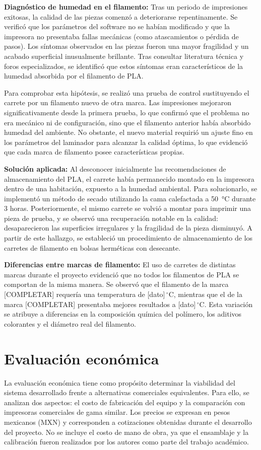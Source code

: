 \textbf{Diagnóstico de humedad en el filamento:} Tras un periodo de 
impresiones exitosas, la calidad de las piezas comenzó a deteriorarse 
repentinamente. Se verificó que los parámetros del software no se habían 
modificado y que la impresora no presentaba fallas mecánicas (como 
atascamientos o pérdida de pasos). Los síntomas observados en las piezas 
fueron una mayor fragilidad y un acabado superficial inusualmente brillante. 
Tras consultar literatura técnica y foros especializados, se identificó que 
estos síntomas eran característicos de la humedad absorbida por el filamento 
de PLA.

Para comprobar esta hipótesis, se realizó una prueba de control sustituyendo 
el carrete por un filamento nuevo de otra marca. Las impresiones mejoraron 
significativamente desde la primera prueba, lo que confirmó que el problema 
no era mecánico ni de configuración, sino que el filamento anterior había 
absorbido humedad del ambiente. No obstante, el nuevo material requirió un 
ajuste fino en los parámetros del laminador para alcanzar la calidad óptima, 
lo que evidenció que cada marca de filamento posee características propias.

\textbf{Solución aplicada:} Al desconocer inicialmente las recomendaciones de 
almacenamiento del PLA, el carrete había permanecido montado en la impresora 
dentro de una habitación, expuesto a la humedad ambiental. 
Para solucionarlo, 
se implementó un método de secado utilizando la cama calefactada a 
\qty{50}{\celsius} durante 3 horas. Posteriormente, el mismo carrete se volvió 
a montar para imprimir una pieza de prueba, y se observó una recuperación 
notable en la calidad: desaparecieron las superficies irregulares y la fragilidad de la pieza disminuyó. A partir de este hallazgo, se estableció un procedimiento de almacenamiento de los carretes de filamento en bolsas herméticas con desecante.

\textbf{Diferencias entre marcas de filamento:} El uso de carretes de 
distintas marcas durante el proyecto evidenció que no todos los filamentos 
de PLA se comportan de la misma manera. Se observó que el filamento de la 
marca [COMPLETAR] requería una temperatura de [dato]\,\(^\circ\)C, mientras 
que el de la marca [COMPLETAR] presentaba mejores resultados a 
[dato]\,\(^\circ\)C. Esta variación se atribuye a diferencias en la 
composición química del polímero, los aditivos colorantes y el diámetro real 
del filamento.


\section{Evaluación económica}
La evaluación económica tiene como propósito determinar la viabilidad del sistema desarrollado frente a alternativas comerciales equivalentes. Para ello, se analizan dos aspectos: el costo de fabricación del equipo y la comparación con impresoras comerciales de gama similar. Los precios se expresan en pesos mexicanos (MXN) y corresponden a cotizaciones obtenidas durante el desarrollo del proyecto. No se incluye el costo de mano de obra, ya que el ensamblaje y la calibración fueron realizados por los autores como parte del trabajo académico. 


